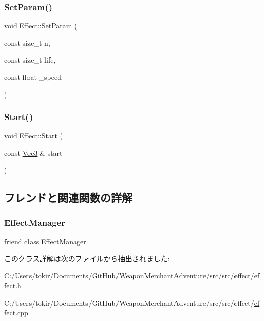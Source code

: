 \mbox{\label{class_effect_a382a3189eb3a9fd9fbd9edf80c661225}} 
\subsubsection{\texorpdfstring{Set\+Param()}{SetParam()}}
{\footnotesize\ttfamily void Effect\+::\+Set\+Param (\begin{DoxyParamCaption}\item[{const size\+\_\+t}]{n,  }\item[{const size\+\_\+t}]{life,  }\item[{const float}]{\+\_\+speed }\end{DoxyParamCaption})}

\mbox{\label{class_effect_a8a2e4b2b5c71a95ed864f4fd64b10343}} 
\subsubsection{\texorpdfstring{Start()}{Start()}}
{\footnotesize\ttfamily void Effect\+::\+Start (\begin{DoxyParamCaption}\item[{const \mbox{\hyperlink{common_8h_ab1cb35b3a17c398d8ef71d5f779808bf}{Vec3}} \&}]{start }\end{DoxyParamCaption})}



\subsection{フレンドと関連関数の詳解}
\mbox{\label{class_effect_aa57a70c5d4b8abc800f69a1681448634}} 
\subsubsection{\texorpdfstring{Effect\+Manager}{EffectManager}}
{\footnotesize\ttfamily friend class \mbox{\hyperlink{class_effect_manager}{Effect\+Manager}}\hspace{0.3cm}{\ttfamily [friend]}}



このクラス詳解は次のファイルから抽出されました\+:\begin{DoxyCompactItemize}
\item 
C\+:/\+Users/tokir/\+Documents/\+Git\+Hub/\+Weapon\+Merchant\+Adventure/src/src/effect/\mbox{\hyperlink{effect_8h}{effect.\+h}}\item 
C\+:/\+Users/tokir/\+Documents/\+Git\+Hub/\+Weapon\+Merchant\+Adventure/src/src/effect/\mbox{\hyperlink{effect_8cpp}{effect.\+cpp}}\end{DoxyCompactItemize}

